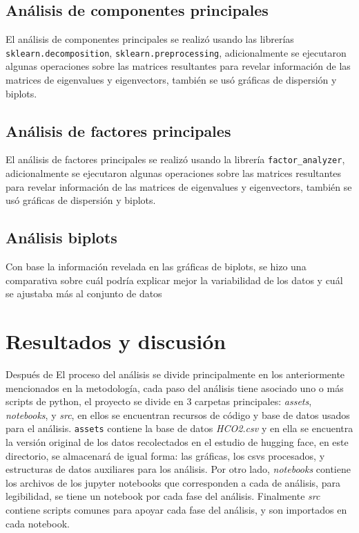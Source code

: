\documentclass[journal]{IEEEtran}
\begin{document}
	\subsection{Análisis de componentes principales}
	\label{ssec:pca}
	El análisis de componentes principales se realizó usando las librerías \texttt{sklearn.decomposition}, \texttt{sklearn.preprocessing}, adicionalmente se ejecutaron algunas operaciones sobre las matrices resultantes para revelar información de las matrices de eigenvalues y eigenvectors, también se usó gráficas de dispersión y biplots.

	\subsection{Análisis de factores principales}
	El análisis de factores principales se realizó usando la librería \texttt{factor\_analyzer}, adicionalmente se ejecutaron algunas operaciones sobre las matrices resultantes para revelar información de las matrices de eigenvalues y eigenvectors, también se usó gráficas de dispersión y biplots.


	\subsection{Análisis biplots}
	Con base la información revelada en las gráficas de biplots, se hizo una comparativa sobre cuál podría explicar mejor la variabilidad de los datos y cuál se ajustaba más al conjunto de datos

	\section{Resultados y discusión}
	Después de
	\label{sec:data}
	El proceso del análisis se divide principalmente en los anteriormente mencionados en la metodología, cada paso del análisis tiene asociado uno o más scripts de python, el proyecto se divide en 3 carpetas principales: \textit{assets}, \textit{notebooks},  y \textit{src}, en ellos se encuentran recursos de código y base de datos usados para el análisis. \texttt{assets} contiene la base de datos \textit{HCO2.csv} y en ella se encuentra la versión original de los datos recolectados en el estudio de hugging face\cite{exploring_carbon_footprint}, en este directorio, se almacenará de igual forma: las gráficas, los csvs procesados, y estructuras de datos auxiliares para los análisis. Por otro lado, \textit{notebooks} contiene los archivos de los jupyter notebooks que corresponden a cada de análisis, para legibilidad, se tiene un notebook por cada fase del análisis. Finalmente  \textit{src} contiene scripts comunes para apoyar cada fase del análisis, y son importados en cada notebook.
\end{document}
